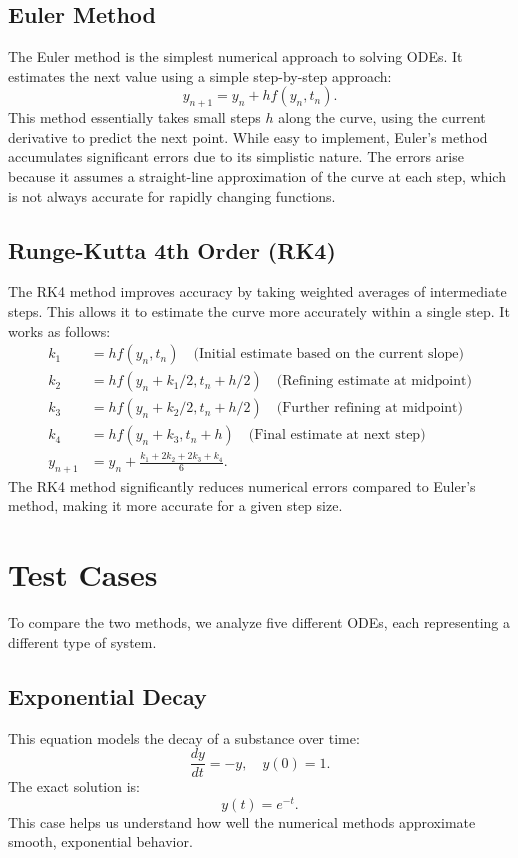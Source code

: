 \documentclass{article}
\begin{document}
\subsection{Euler Method}
The Euler method is the simplest numerical approach to solving ODEs. It estimates the next value using a simple step-by-step approach:
\begin{equation}
    y_{n+1} = y_n + h f(y_n, t_n).
\end{equation}
This method essentially takes small steps \( h \) along the curve, using the current derivative to predict the next point. While easy to implement, Euler’s method accumulates significant errors due to its simplistic nature. The errors arise because it assumes a straight-line approximation of the curve at each step, which is not always accurate for rapidly changing functions.

\subsection{Runge-Kutta 4th Order (RK4)}
The RK4 method improves accuracy by taking weighted averages of intermediate steps. This allows it to estimate the curve more accurately within a single step. It works as follows:
\begin{align}
    k_1 &= h f(y_n, t_n) \quad \text{(Initial estimate based on the current slope)} \\
    k_2 &= h f(y_n + k_1/2, t_n + h/2) \quad \text{(Refining estimate at midpoint)} \\
    k_3 &= h f(y_n + k_2/2, t_n + h/2) \quad \text{(Further refining at midpoint)} \\
    k_4 &= h f(y_n + k_3, t_n + h) \quad \text{(Final estimate at next step)} \\
    y_{n+1} &= y_n + \frac{k_1 + 2k_2 + 2k_3 + k_4}{6}.
\end{align}
The RK4 method significantly reduces numerical errors compared to Euler’s method, making it more accurate for a given step size.

\section{Test Cases}
To compare the two methods, we analyze five different ODEs, each representing a different type of system.

\subsection{Exponential Decay}
This equation models the decay of a substance over time:
\begin{equation}
    \frac{dy}{dt} = -y, \quad y(0) = 1.
\end{equation}
The exact solution is:
\begin{equation}
    y(t) = e^{-t}.
\end{equation}
This case helps us understand how well the numerical methods approximate smooth, exponential behavior.
\end{document}
